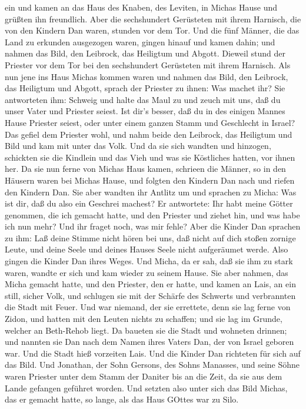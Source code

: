 ein und kamen an das Haus des Knaben, des Leviten, in Michas Hause und
grüßten ihn freundlich.  Aber die sechshundert Gerüsteten
mit ihrem Harnisch, die von den Kindern Dan waren, stunden vor dem Tor.
 Und die fünf Männer, die das Land zu erkunden ausgezogen
waren, gingen hinauf und kamen dahin; und nahmen das Bild, den Leibrock,
das Heiligtum und Abgott. Dieweil stund der Priester vor dem Tor bei den
sechshundert Gerüsteten mit ihrem Harnisch.  Als nun jene
ins Haus Michas kommen waren und nahmen das Bild, den Leibrock, das
Heiligtum und Abgott, sprach der Priester zu ihnen: Was machet ihr?
 Sie antworteten ihm: Schweig und halte das Maul zu und
zeuch mit uns, daß du unser Vater und Priester seiest. Ist dir's besser,
daß du in des einigen Mannes Hause Priester seiest, oder unter einem
ganzen Stamm und Geschlecht in Israel?  Das gefiel dem
Priester wohl, und nahm beide den Leibrock, das Heiligtum und Bild und
kam mit unter das Volk.  Und da sie sich wandten und
hinzogen, schickten sie die Kindlein und das Vieh und was sie Köstliches
hatten, vor ihnen her.  Da sie nun ferne von Michas Haus
kamen, schrieen die Männer, so in den Häusern waren bei Michas Hause,
und folgten den Kindern Dan nach und riefen den Kindern Dan.
 Sie aber wandten ihr Antlitz um und sprachen zu Micha: Was
ist dir, daß du also ein Geschrei machest?  Er antwortete:
Ihr habt meine Götter genommen, die ich gemacht hatte, und den Priester
und ziehet hin, und was habe ich nun mehr? Und ihr fraget noch, was mir
fehle?  Aber die Kinder Dan sprachen zu ihm: Laß deine
Stimme nicht hören bei uns, daß nicht auf dich stoßen zornige Leute, und
deine Seele und deines Hauses Seele nicht aufgeräumet werde.
 Also gingen die Kinder Dan ihres Weges. Und Micha, da er
sah, daß sie ihm zu stark waren, wandte er sich und kam wieder zu seinem
Hause.  Sie aber nahmen, das Micha gemacht hatte, und den
Priester, den er hatte, und kamen an Lais, an ein still, sicher Volk,
und schlugen sie mit der Schärfe des Schwerts und verbrannten die Stadt
mit Feuer.  Und war niemand, der sie errettete, denn sie
lag ferne von Zidon, und hatten mit den Leuten nichts zu schaffen; und
sie lag im Grunde, welcher an Beth-Rehob liegt. Da baueten sie die Stadt
und wohneten drinnen;  und nannten sie Dan nach dem Namen
ihres Vaters Dan, der von Israel geboren war. Und die Stadt hieß
vorzeiten Lais.  Und die Kinder Dan richteten für sich auf
das Bild. Und Jonathan, der Sohn Gersons, des Sohns Manasses, und seine
Söhne waren Priester unter dem Stamm der Daniter bis an die Zeit, da sie
aus dem Lande gefangen geführet worden.  Und setzten also
unter sich das Bild Michas, das er gemacht hatte, so lange, als das Haus
GOttes war zu Silo.

